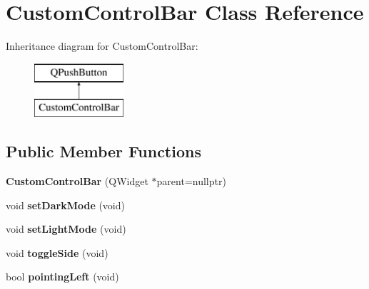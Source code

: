 \hypertarget{class_custom_control_bar}{}\section{Custom\+Control\+Bar Class Reference}
\label{class_custom_control_bar}
Inheritance diagram for Custom\+Control\+Bar\+:\begin{figure}[H]
\begin{center}
\leavevmode
\includegraphics[height=2.000000cm]{class_custom_control_bar}
\end{center}
\end{figure}
\subsection*{Public Member Functions}
\begin{DoxyCompactItemize}
\item 
\mbox{\label{class_custom_control_bar_a9329f07f4c566ad4427898976a7c54e9}} 
{\bfseries Custom\+Control\+Bar} (Q\+Widget $\ast$parent=nullptr)
\item 
\mbox{\label{class_custom_control_bar_a06869826febedb072e3563b67233c1a6}} 
void {\bfseries set\+Dark\+Mode} (void)
\item 
\mbox{\label{class_custom_control_bar_ad144dfcd0631cf953f6835f725d8fb22}} 
void {\bfseries set\+Light\+Mode} (void)
\item 
\mbox{\label{class_custom_control_bar_ad866a00b234d58ea00f485590a939e12}} 
void {\bfseries toggle\+Side} (void)
\item 
\mbox{\label{class_custom_control_bar_ab5d80c519c4c0675cc2b1de53a83ba27}} 
bool {\bfseries pointing\+Left} (void)
\end{DoxyCompactItemize}
